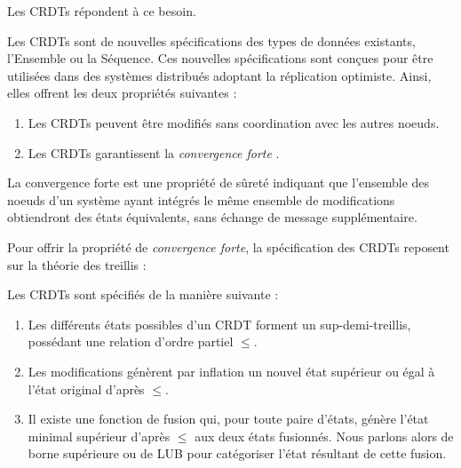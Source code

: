 Les \acfp{CRDT} \cite{shapiro_2011_crdt, 2018-crdts-perguica-baquero-shapiro, 2018-crdts-overview-preguica} répondent à ce besoin.

\begin{definition}
  Les \acp{CRDT} sont de nouvelles spécifications des types de données existants, \eg l'Ensemble ou la Séquence.
  Ces nouvelles spécifications sont conçues pour être utilisées dans des systèmes distribués adoptant la réplication optimiste.
  Ainsi, elles offrent les deux propriétés suivantes :

  \begin{enumerate}
    \item Les \acp{CRDT} peuvent être modifiés sans coordination avec les autres noeuds.
    \item Les \acp{CRDT} garantissent la \emph{convergence forte} \cite{shapiro_2011_crdt}.
  \end{enumerate}
\end{definition}

\begin{definition}
  La convergence forte est une propriété de sûreté indiquant que l'ensemble des noeuds d'un système ayant intégrés le même ensemble de modifications obtiendront des états équivalents, sans échange de message supplémentaire.
\end{definition}

Pour offrir la propriété de \emph{convergence forte}, la spécification des \acp{CRDT} reposent sur la théorie des treillis \cite{2002-intro-lattices-order-davey} :

\begin{definition}
  \label{def:spec-crdts}
  Les \acp{CRDT} sont spécifiés de la manière suivante :
  \begin{enumerate}
    \item Les différents états possibles d'un \ac{CRDT} forment un sup-demi-treillis, possédant une relation d'ordre partiel $\leq$.
    \item Les modifications génèrent par inflation un nouvel état supérieur ou égal à l'état original d'après $\leq$.
    \item \label{item:lub} Il existe une fonction de fusion qui, pour toute paire d'états, génère l'état minimal supérieur d'après $\leq$ aux deux états fusionnés.
    Nous parlons alors de borne supérieure ou de \ac{LUB} pour catégoriser l'état résultant de cette fusion.
  \end{enumerate}
\end{definition}


